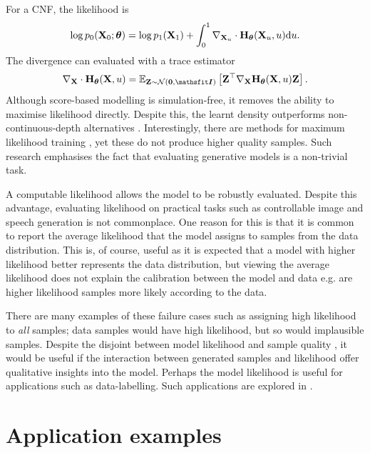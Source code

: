 For a \ac{CNF}, the likelihood is
\[
\log p_0({\mathbf{X}}_0;{\bm{\theta}})=\log p_1({\mathbf{X}}_1) +\int_0^1\nabla_{{\mathbf{X}}_u}\cdot {\mathbf{H}}_{\bm{\theta}}({\mathbf{X}}_u,u)\mathrm{d} u.
\]
The divergence can evaluated with a trace
estimator \citep{skillingEigenvaluesMegadimensionalMatrices1989,hutchinsonStochasticEstimatorTrace1989}
\[
\nabla_{\rmX}\cdot\rmH_\vtheta(\rmX,u)=\E_{\rmZ\sim\gN(\bm0,\tI)}\left[\rmZ^\top\nabla_{\rmX}\rmH_\vtheta(\rmX,u)\rmZ\right].
\]
Although score-based modelling is simulation-free, it removes the ability to maximise likelihood directly. Despite this, the learnt density outperforms non-continuous-depth alternatives \citep{song2021sde}. Interestingly, there are methods for maximum likelihood training \cite{songMaximumLikelihoodTraining2021}, yet these do not produce higher quality samples. Such research emphasises the fact that evaluating generative models is a non-trivial task.


A computable likelihood allows the model to be robustly evaluated. Despite this advantage, evaluating likelihood on practical tasks such as controllable image and speech generation is not commonplace. One reason for this is that it is common to report the average likelihood that the model assigns to samples from the data distribution. This is, of course, useful as it is expected that a model with higher likelihood better represents the data distribution, but viewing the average likelihood does not explain the calibration between the model and data e.g. are higher likelihood samples more likely according to the data.

There are many examples of these failure cases such as assigning high likelihood to \textit{all} samples; data samples would have high likelihood, but so would implausible samples. Despite the disjoint between model likelihood and sample quality \citep{theisNoteEvaluationGenerative2016}, it would be useful if the interaction between generated samples and likelihood offer qualitative insights into the model. Perhaps the model likelihood is useful for applications such as data-labelling. Such applications are explored in .


\section{Application examples}



